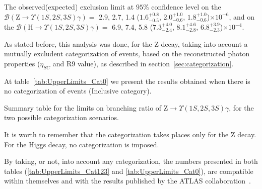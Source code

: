 The observed(expected) exclusion limit at $95\%$ confidence level on the $\mathcal{B}(\mathrm{Z}\to\Upsilon(1S,2S,3S)\gamma)=$ 2.9, 2.7, 1.4 ($1.6^{+0.8}_{-0.5}$,  $2.0^{+1.0}_{-0.6}$, $1.8^{+1.0}_{-0.6}$)$\times 10^{-6}$, and on the $\mathcal{B}(\mathrm{H}\to\Upsilon(1S,2S,3S)\gamma)=$ 6.9, 7.4, 5.8 ($7.3^{+4.0}_{-2.4}$,  $8.1^{+4.6}_{-2.8}$, $6.8^{+3.9}_{-2.3}$)$\times 10^{-4}$.

As stated before, this analysis was done, for the Z decay, taking into account a mutually excludent categorization of events, based on the reconstructed photon properties ($\eta_{SC}$ and R9 value), as described in section~\ref{sec:categorization}. 

At table~\ref{tab:UpperLimits_Cat0} we present the results obtained when there is no categorization of events (Inclusive category).

\begin{table}[ht]
\begin{center}
% 

\caption{Summary table for the limits on branching ratio of $\mathrm{Z}\to\Upsilon(1S,2S,3S)\gamma$, for the two possible categorization scenarios.}
\label{tab:UpperLimits_Cat0}
\end{center}
\end{table}


It is worth to remember that the categorization takes places only for the Z decay. For the Higgs decay, no categorization is imposed.

By taking, or not, into account any categorization, the numbers presented in both tables (\ref{tab:UpperLimits_Cat123} and \ref{tab:UpperLimits_Cat0}), are compatible within themselves and with the results published by the ATLAS collaboration~\cite{Aaboud_2018}.


\clearpage
